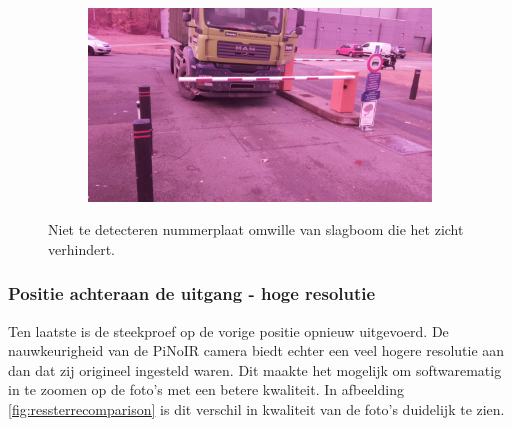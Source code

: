 \begin{figure}[h!]
	\centering
	\begin{subfigure}[b]{0.99\linewidth}
		\includegraphics[width=\linewidth]{img/sterachter/sterachter3.jpg}
	\end{subfigure}
	\caption{Niet te detecteren nummerplaat omwille van slagboom die het zicht verhindert.}
	\label{fig:slagboomster}
\end{figure}

\subsubsection{Positie achteraan de uitgang - hoge resolutie}
Ten laatste is de steekproef op de vorige positie opnieuw uitgevoerd. De nauwkeurigheid van de PiNoIR camera biedt echter een veel hogere resolutie aan dan dat zij origineel ingesteld waren. Dit maakte het mogelijk om softwarematig in te zoomen op de foto's met een betere kwaliteit. In afbeelding \ref{fig:ressterrecomparison} is dit verschil in kwaliteit van de foto's duidelijk te zien.

